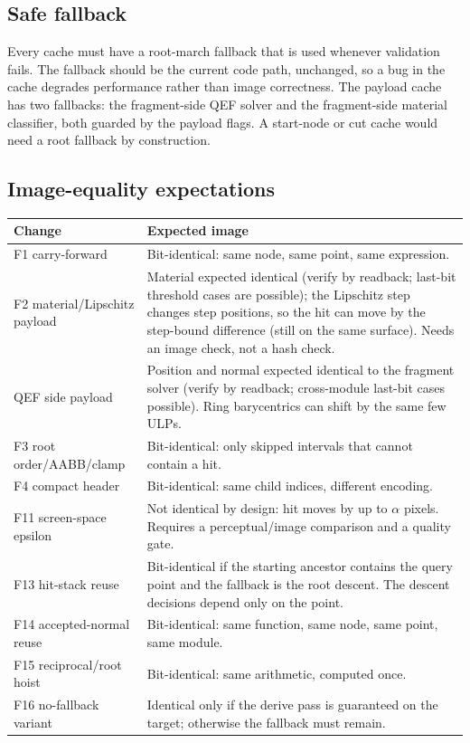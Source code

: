 \documentclass[11pt,a4paper]{article}
\theoremstyle{plain}
\theoremstyle{definition}
\theoremstyle{remark}
\begin{document}
\subsection{Safe fallback}

Every cache must have a root-march fallback that is used whenever validation
fails. The fallback should be the current code path, unchanged, so a bug in
the cache degrades performance rather than image correctness. The payload
cache has two fallbacks: the fragment-side QEF solver and the fragment-side
material classifier, both guarded by the payload flags. A start-node or cut
cache would need a root fallback by construction.

\subsection{Image-equality expectations}

\begin{center}
\small
\begin{tabularx}{\linewidth}{@{}lX@{}}
\toprule
Change & Expected image \\
\midrule
F1 carry-forward & Bit-identical: same node, same point, same expression. \\
F2 material/Lipschitz payload & Material expected identical (verify by
  readback; last-bit threshold cases are possible); the Lipschitz step changes
  step positions, so the hit can move by the step-bound difference (still on
  the same surface). Needs an image check, not a hash check. \\
QEF side payload & Position and normal expected identical to the fragment
  solver (verify by readback; cross-module last-bit cases possible). Ring
  barycentrics can shift by the same few ULPs. \\
F3 root order/AABB/clamp & Bit-identical: only skipped intervals that cannot
  contain a hit. \\
F4 compact header & Bit-identical: same child indices, different encoding. \\
F11 screen-space epsilon & Not identical by design: hit moves by up to
  $\alpha$ pixels. Requires a perceptual/image comparison and a quality gate. \\
F13 hit-stack reuse & Bit-identical if the starting ancestor contains the
  query point and the fallback is the root descent. The descent decisions
  depend only on the point. \\
F14 accepted-normal reuse & Bit-identical: same function, same node, same
  point, same module. \\
F15 reciprocal/root hoist & Bit-identical: same arithmetic, computed once. \\
F16 no-fallback variant & Identical only if the derive pass is guaranteed on
  the target; otherwise the fallback must remain. \\
\bottomrule
\end{tabularx}
\end{center}
\end{document}
